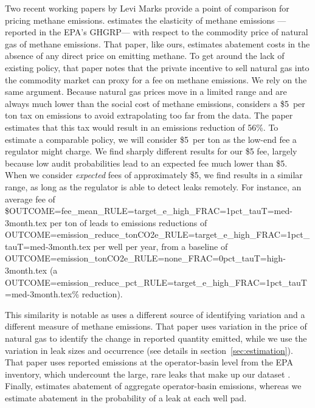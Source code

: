 \documentclass[12pt,oneside,letterpaper]{article}
\theoremstyle{definition}
\begin{document}
\begin{refsection}
Two recent working papers by Levi Marks provide a point of comparison for pricing methane emissions.
\textcite{Marks:2021} estimates the elasticity of methane emissions%
---reported in the \gls{EPA}'s \gls{GHGRP}---%
with respect to  the commodity price of natural gas of methane emissions.
That paper, like ours, estimates abatement costs in the absence of any direct price on emitting methane.
To get around the lack of existing policy, that paper notes that the private incentive to sell natural gas into the commodity market can proxy for a fee on methane emissions.
We rely on the same argument.
Because natural gas prices move in a limited range and are always much lower than the social cost of methane emissions, \textcite{Marks:2021} considers a \$5~per ton  tax on emissions to avoid extrapolating too far from the data.
The paper estimates that this tax would result in an emissions reduction of 56\%.
To estimate a comparable policy, we will consider \$5~per ton  as the low-end fee a regulator might charge.
We find sharply different results for our \$5 fee, largely because low audit probabilities lead to an expected fee much lower than \$5.
When we consider \emph{expected} fees of approximately \$5, we find results in a similar range, as long as the regulator is able to detect leaks remotely.
For instance, an average fee of
\${OUTCOME=fee_mean_RULE=target_e_high_FRAC=1pct_tauT=med-3month.tex}
per ton of 
leads to emissions reductions of
{OUTCOME=emission_reduce_tonCO2e_RULE=target_e_high_FRAC=1pct_tauT=med-3month.tex}
 per well per year, from a baseline of
{OUTCOME=emission_tonCO2e_RULE=none_FRAC=0pct_tauT=high-3month.tex}
(a {OUTCOME=emission_reduce_pct_RULE=target_e_high_FRAC=1pct_tauT=med-3month.tex}\%
reduction).

This similarity is notable as \textcite{Marks:2021} uses a different source of identifying variation and a different measure of methane emissions.
That paper uses variation in the price of natural gas to identify the change in reported quantity emitted, while we  use the variation in leak sizes and occurrence
(see details in section~\ref{sec:estimation}).
That paper uses reported emissions at the operator-basin level from the \gls{EPA} inventory, which undercount the large, rare leaks that make up our dataset \parencite{Robertson/etal:2020}.
Finally, \textcite{Marks:2021} estimates abatement of aggregate operator-basin emissions, whereas we estimate abatement in the probability of a leak at each well pad.


\end{refsection}
\end{document}
